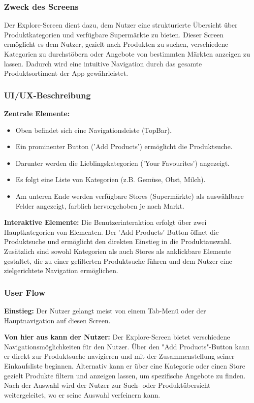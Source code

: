 \subsubsection{Zweck des Screens}
Der Explore-Screen dient dazu, dem Nutzer eine strukturierte Übersicht über Produktkategorien und verfügbare Supermärkte zu bieten. Dieser Screen ermöglicht es dem Nutzer, gezielt nach Produkten zu suchen, verschiedene Kategorien zu durchstöbern oder Angebote von bestimmten Märkten anzeigen zu lassen. Dadurch wird eine intuitive Navigation durch das gesamte Produktsortiment der App gewährleistet.

\subsubsection{UI/UX-Beschreibung}

\textbf{Zentrale Elemente:}
\begin{itemize}
    \item Oben befindet sich eine Navigationsleiste (TopBar).
    \item Ein prominenter Button ('Add Products') ermöglicht die Produktsuche.
    \item Darunter werden die Lieblingskategorien ('Your Favourites') angezeigt.
    \item Es folgt eine Liste von Kategorien (z.B. Gemüse, Obst, Milch).
    \item Am unteren Ende werden verfügbare Stores (Supermärkte) als auswählbare Felder angezeigt, farblich hervorgehoben je nach Markt.
\end{itemize}

\noindent\textbf{Interaktive Elemente:}
Die Benutzerinteraktion erfolgt über zwei Hauptkategorien von Elementen. Der 'Add Products'-Button öffnet die Produktsuche und ermöglicht den direkten Einstieg in die Produktauswahl. Zusätzlich sind sowohl Kategorien als auch Stores als anklickbare Elemente gestaltet, die zu einer gefilterten Produktsuche führen und dem Nutzer eine zielgerichtete Navigation ermöglichen.

\subsubsection{User Flow}

\textbf{Einstieg:} Der Nutzer gelangt meist von einem Tab-Menü oder der Hauptnavigation auf diesen Screen.

\noindent\textbf{Von hier aus kann der Nutzer:}
Der Explore-Screen bietet verschiedene Navigationsmöglichkeiten für den Nutzer. Über den "Add Products"-Button kann er direkt zur Produktsuche navigieren und mit der Zusammenstellung seiner Einkaufsliste beginnen. Alternativ kann er über eine Kategorie oder einen Store gezielt Produkte filtern und anzeigen lassen, um spezifische Angebote zu finden. Nach der Auswahl wird der Nutzer zur Such- oder Produktübersicht weitergeleitet, wo er seine Auswahl verfeinern kann.

